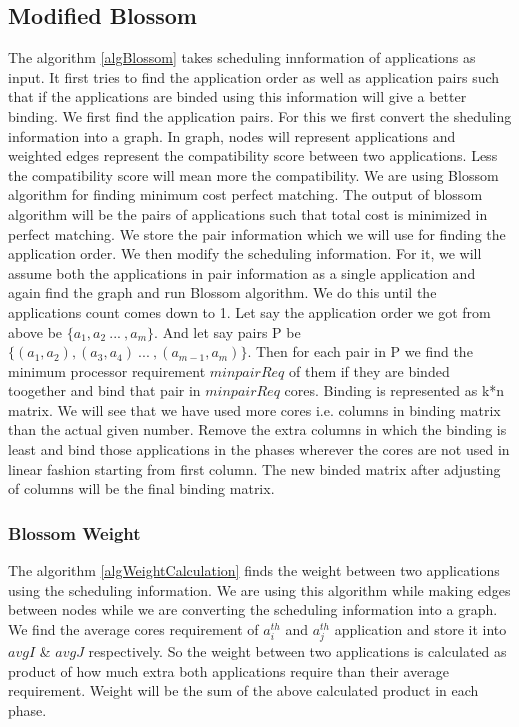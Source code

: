 \documentclass[10pt, conference]{IEEEtran}
\begin{document}
\subsection{Modified Blossom}
The algorithm \ref{algBlossom} takes scheduling innformation of applications as input. It first tries to find the application order as well as application pairs such that if the applications are binded using this information will give a better binding. We first find the application pairs. For this we first convert the sheduling information into a graph. In graph, nodes will represent applications and weighted edges represent the compatibility score between two applications. Less the compatibility score will mean more the compatibility. We are using Blossom algorithm for finding minimum cost perfect matching. The output of blossom algorithm will be the pairs of applications such that total cost is minimized in perfect matching. We store the pair information which we will use for finding the application order. We then modify the scheduling information. For it, we will assume both the applications in pair information as a single application and again find the graph and run Blossom algorithm. We do this until the applications count comes down to 1. Let say the application order we got from above be $\{a_1, a_2\:...\:, a_{m}\}$. And let say pairs P be $\{(a_1,a_2),(a_3,a_4)\:...\:, (a_{m-1},a_{m})\}$. Then for each pair in P we find the minimum processor requirement $minpairReq$ of them if they are binded toogether and bind that pair in $minpairReq$ cores. Binding is represented as k*n matrix. We will see that we have used more cores i.e. columns in binding matrix than the actual given number. Remove the extra columns in which the binding is least and bind those applications in the phases wherever the cores are not used in linear fashion starting from first column. The new binded matrix after adjusting of columns will be the final binding matrix.


\subsubsection{Blossom Weight}
The algorithm \ref{algWeightCalculation} finds the weight between two applications using the scheduling information. We are using this algorithm while making edges between nodes while we are converting the scheduling information into a graph. We find the average cores requirement of $a_i^{th}$ and $a_j^{th}$ application and store it into $avgI$ \& $avgJ$ respectively. So the weight between two applications is calculated as product of how much extra both applications require than their average requirement. Weight will be the sum of the above calculated product in each phase.
\end{document}
